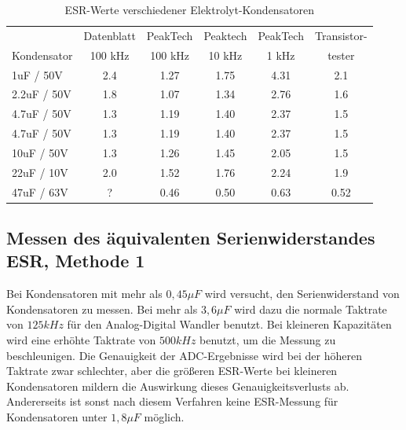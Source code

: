 \begin{table}[H]
  \begin{center}
    \begin{tabular}{| l | c | c | c | c | c |}
   \hline
            & Datenblatt & PeakTech  & Peaktech & PeakTech & Transistor- \\
Kondensator & 100 kHz    & 100 kHz   & 10 kHz   & 1 kHz    & tester  \\
    \hline
    \hline
1uF / 50V    & 2.4       & 1.27      & 1.75     & 4.31     &  2.1 \\
    \hline
2.2uF / 50V  & 1.8       & 1.07      & 1.34     & 2.76     &  1.6 \\
    \hline
4.7uF / 50V  & 1.3       & 1.19      & 1.40     & 2.37     &  1.5 \\
    \hline
4.7uF / 50V  & 1.3       & 1.19      & 1.40     & 2.37     &  1.5 \\
    \hline
10uF / 50V   & 1.3       & 1.26      & 1.45     & 2.05     &  1.5 \\
    \hline
22uF / 10V   & 2.0       & 1.52      & 1.76     & 2.24     &  1.9 \\
    \hline
47uF / 63V   & ?         & 0.46      & 0.50     & 0.63     &  0.52 \\
    \hline
    \end{tabular}
  \end{center}
  \caption{ESR-Werte verschiedener Elektrolyt-Kondensatoren}
  \label{tab:capESR} 
\end{table}


\subsection{Messen des äquivalenten Serienwiderstandes ESR, Methode 1}
Bei Kondensatoren mit mehr als \(0,45\mu F\) wird versucht, den Serienwiderstand von Kondensatoren zu messen.
Bei mehr als \(3,6\mu F\) wird dazu die normale Taktrate von \(125kHz\) für den Analog-Digital Wandler benutzt.
Bei kleineren Kapazitäten wird eine erhöhte Taktrate von \(500kHz\) benutzt, um die Messung zu beschleunigen.
Die Genauigkeit der ADC-Ergebnisse wird bei der höheren Taktrate zwar schlechter, aber die größeren ESR-Werte
bei kleineren Kondensatoren mildern die Auswirkung dieses Genauigkeitsverlusts ab. 
Andererseits ist sonst nach diesem Verfahren keine ESR-Messung für Kondensatoren unter \(1,8\mu F\) möglich.

